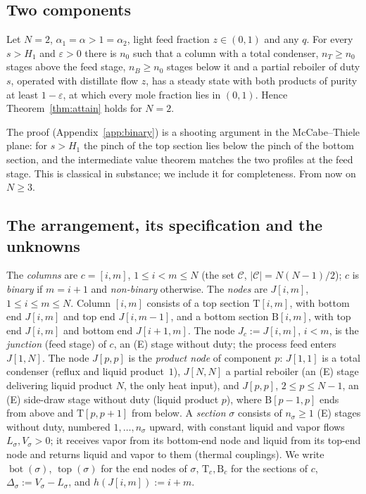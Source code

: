 \documentclass[11pt,a4paper]{report}
\newcommand{\cC}{\mathcal C}
\newcommand{\Ts}{\mathrm T}
\newcommand{\Bs}{\mathrm B}
\newcommand{\bott}{\operatorname{bot}}
\newcommand{\topp}{\operatorname{top}}
\begin{document}
\subsection{Two components}

\begin{proposition}\label{prop:binary}
Let \(N=2\), \(\alpha_1=\alpha>1=\alpha_2\), light feed fraction \(z\in(0,1)\) and any \(q\). For every \(s>H_1\) and \(\varepsilon>0\)
there is \(n_0\) such that a column with a total condenser, \(n_T\ge n_0\) stages above the feed stage, \(n_B\ge n_0\) stages
below it and a partial reboiler of duty \(s\), operated with distillate flow \(z\), has a steady state with both products
of purity at least \(1-\varepsilon\), at which every mole fraction lies in \((0,1)\). Hence Theorem~\ref{thm:attain} holds for
\(N=2\).
\end{proposition}

The proof (Appendix~\ref{app:binary}) is a shooting argument in the McCabe--Thiele plane: for \(s>H_1\) the pinch of the
top section lies below the pinch of the bottom section, and the intermediate value theorem matches the two profiles at
the feed stage. This is classical in substance; we include it for completeness. From now on \(N\ge3\).

\subsection{The arrangement, its specification and the unknowns}\label{sec:arrangement}

\begin{definition}\label{def:petlyuk}
The \emph{columns} are \(c=[i,m]\), \(1\le i<m\le N\) (the set \(\cC\), \(|\cC|=N(N-1)/2\)); \(c\) is \emph{binary} if \(m=i+1\) and
\emph{non-binary} otherwise. The \emph{nodes} are \(J[i,m]\), \(1\le i\le m\le N\). Column \([i,m]\) consists of a top section
\(\Ts[i,m]\), with bottom end \(J[i,m]\) and top end \(J[i,m-1]\), and a bottom section \(\Bs[i,m]\), with top end \(J[i,m]\) and
bottom end \(J[i+1,m]\). The node \(J_c:=J[i,m]\), \(i<m\), is the \emph{junction} (feed stage) of \(c\), an (E) stage without
duty; the process feed enters \(J[1,N]\). The node \(J[p,p]\) is the \emph{product node} of component \(p\): \(J[1,1]\) is a
total condenser (reflux and liquid product~\(1\)), \(J[N,N]\) a partial reboiler (an (E) stage delivering liquid product
\(N\), the only heat input), and \(J[p,p]\), \(2\le p\le N-1\), an (E) side-draw stage without duty (liquid product \(p\)), where
\(\Bs[p-1,p]\) ends from above and \(\Ts[p,p+1]\) from below. A \emph{section} \(\sigma\) consists of \(n_\sigma\ge1\) (E) stages
without duty, numbered \(1,\dots,n_\sigma\) upward, with constant liquid and vapor flows \(L_\sigma,V_\sigma>0\); it receives
vapor from its bottom-end node and liquid from its top-end node and returns liquid and vapor to them (thermal
couplings). We write \(\bott(\sigma)\), \(\topp(\sigma)\) for the end nodes of \(\sigma\), \(\Ts_c,\Bs_c\) for the sections of
\(c\), \(\Delta_\sigma:=V_\sigma-L_\sigma\), and \(h(J[i,m]):=i+m\).
\end{definition}
\end{document}
